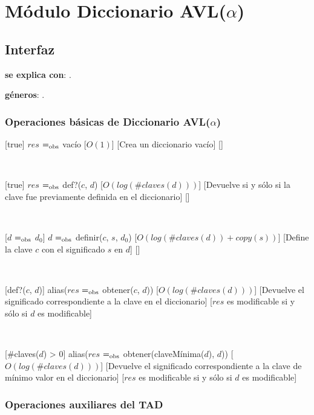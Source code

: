 \section{Módulo Diccionario AVL($\alpha$)}

\subsection{Interfaz}

\textbf{se explica con}: .

\textbf{géneros}: .

\subsubsection{Operaciones básicas de Diccionario AVL($\alpha$)}

	[true]
	{$res$ $=_{\mathrm{obs}}$ vacío}%
	[$O(1)$]
	[Crea un diccionario vacío]
	[]

	~

	[true]
	{$res$ $=_{\mathrm{obs}}$ def?($c$, $d$)}
	[$O(log(\#claves(d)))$]
	[Devuelve  si y sólo si la clave fue previamente definida en el diccionario]
	[]

	~

	[$d$ $=_{\mathrm{obs}}$ $d_0$]
	{$d$ $=_{\mathrm{obs}}$ definir($c$, $s$, $d_0$)}
	[$O(log(\#claves(d)) + copy(s))$]
	[Define la clave $c$ con el significado $s$ en $d$]
	[]

	~

	[def?($c$, $d$)]
	{alias($res$ $=_{\mathrm{obs}}$ obtener($c$, $d$))}
	[$O(log(\#claves(d)))$]
	[Devuelve el significado correspondiente a la clave en el diccionario]
	[$res$ es modificable si y sólo si $d$ es modificable]

	~

	[\#claves($d$) > 0]
	{alias($res$ $=_{\mathrm{obs}}$ obtener(claveMínima($d$), $d$))}
	[$O(log(\#claves(d)))$]
	[Devuelve el significado correspondiente a la clave de mínimo valor en el diccionario]
	[$res$ es modificable si y sólo si $d$ es modificable]

\subsubsection{Operaciones auxiliares del TAD}

